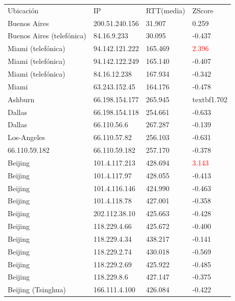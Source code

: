 \begin{tabular}{llll}
	Ubicaci\'on	&	IP	&	RTT(media)	&	ZScore	\\
	Buenos Aires	&	200.51.240.156	&	31.907	&	0.259	\\
	Buenos Aires (telef\'onica)	&	84.16.9.233	&	30.095	&	-0.437	\\
	Miami (telef\'onica)		&	94.142.121.222	&	165.469	&	\textcolor{red}{2.396}	\\
	Miami (telef\'onica)		&	94.142.122.249	&	165.140	&	-0.407	\\
	Miami (telef\'onica)		&	84.16.12.238	&	167.934	&	-0.342	\\
	Miami 			&	63.243.152.45	&	164.176	&	-0.478	\\
	Ashburn			&	66.198.154.177	&	265.945	&	textbf{1.702}	\\
	Dallas			&	66.198.154.118	&	254.661	&	-0.633	\\
	Dallas			&	66.110.56.6	&	267.287	&	-0.139	\\
	Los-Angeles		&	66.110.57.82	&	256.103	&	-0.631	\\
	66.110.59.182		&	66.110.59.182	&	257.170	&	-0.378	\\
	Beijing			&	101.4.117.213	&	428.694	&	\textcolor{red}{3.143}	\\
	Beijing			&	101.4.117.97	&	428.055	&	-0.413	\\
	Beijing			&	101.4.116.146	&	424.990	&	-0.463	\\
	Beijing			&	101.4.118.78	&	427.001	&	-0.358	\\
	Beijing			&	202.112.38.10	&	425.663	&	-0.428	\\
	Beijing			&	118.229.4.66	&	425.672	&	-0.400	\\
	Beijing			&	118.229.4.34	&	438.217	&	-0.141	\\
	Beijing			&	118.229.2.74	&	430.018	&	-0.569	\\
	Beijing			&	118.229.2.69	&	425.922	&	-0.485	\\
	Beijing			&	118.229.8.6	&	427.147	&	-0.375	\\
	Beijing (Tsinghua)		&	166.111.4.100	&	426.084	&	-0.422	\\

\end{tabular}

